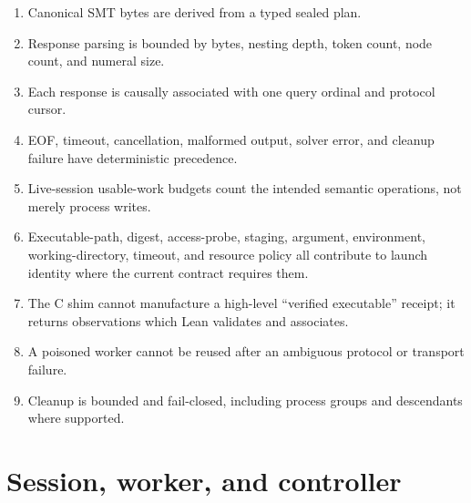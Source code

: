 \documentclass[10pt,letterpaper,oneside]{report}
\begin{document}
\begin{enumerate}
  \item Canonical SMT bytes are derived from a typed sealed plan.
  \item Response parsing is bounded by bytes, nesting depth, token count, node count, and numeral size.
  \item Each response is causally associated with one query ordinal and protocol cursor.
  \item EOF, timeout, cancellation, malformed output, solver error, and cleanup failure have deterministic precedence.
  \item Live-session usable-work budgets count the intended semantic operations, not merely process writes.
  \item Executable-path, digest, access-probe, staging, argument, environment, working-directory, timeout, and resource policy all contribute to launch identity where the current contract requires them.
  \item The C shim cannot manufacture a high-level ``verified executable'' receipt; it returns observations which Lean validates and associates.
  \item A poisoned worker cannot be reused after an ambiguous protocol or transport failure.
  \item Cleanup is bounded and fail-closed, including process groups and descendants where supported.
\end{enumerate}

\section{Session, worker, and controller}
\end{document}
